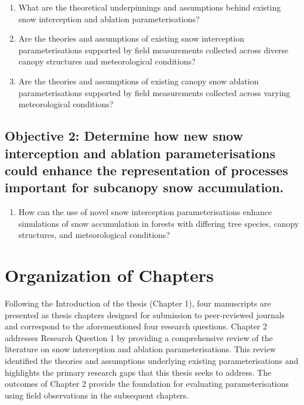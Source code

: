 \documentclass[
  letterpaper,
]{tex/uofsthesis-cs}
\providecommand{\tightlist}{%
  \setlength{\itemsep}{0pt}\setlength{\parskip}{0pt}}
\begin{document}
\begin{enumerate}
\def\labelenumi{\arabic{enumi}.}
\item
  What are the theoretical underpinnings and assumptions behind existing
  snow interception and ablation parameterisations?
\item
  Are the theories and assumptions of existing snow interception
  parameterisations supported by field measurements collected across
  diverse canopy structures and meteorological conditions?
\item
  Are the theories and assumptions of existing canopy snow ablation
  parameterisations supported by field measurements collected across
  varying meteorological conditions?
\end{enumerate}

\subsection{Objective 2: Determine how new snow interception and
ablation parameterisations could enhance the representation of processes
important for subcanopy snow
accumulation.}\label{objective-2-determine-how-new-snow-interception-and-ablation-parameterisations-could-enhance-the-representation-of-processes-important-for-subcanopy-snow-accumulation.}

\begin{enumerate}
\def\labelenumi{\arabic{enumi}.}
\setcounter{enumi}{3}
\tightlist
\item
  How can the use of novel snow interception parameterisations enhance
  simulations of snow accumulation in forests with differing tree
  species, canopy structures, and meteorological conditions?
\end{enumerate}

\section{Organization of Chapters}\label{organization-of-chapters}

Following the Introduction of the thesis (Chapter 1), four manuscripts
are presented as thesis chapters designed for submission to
peer-reviewed journals and correspond to the aforementioned four
research questions. Chapter 2 addresses Research Question 1 by providing
a comprehensive review of the literature on snow interception and
ablation parameterisations. This review identified the theories and
assumptions underlying existing parameterisations and highlights the
primary research gaps that this thesis seeks to address. The outcomes of
Chapter 2 provide the foundation for evaluating parameterisations using
field observations in the subsequent chapters.
\end{document}
